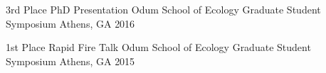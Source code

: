 



\begin{cvhonors}
  \cvhonor
    {3rd Place PhD Presentation}
    {Odum School of Ecology Graduate Student Symposium}
    {Athens, GA}
    {2016}

  \cvhonor
    {1st Place Rapid Fire Talk} %
    {Odum School of Ecology Graduate Student Symposium} %
    {Athens, GA} %
    {2015} %

\end{cvhonors}

\medskip


